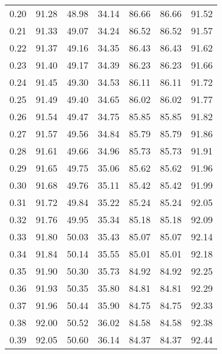 \begin{tabular}{|c|c|c|c|c|c|c|}
      0.20 &     91.28 &     48.98 &      34.14 &   86.66 &      86.66 &         91.52 \\
      0.21 &     91.33 &     49.07 &      34.24 &   86.52 &      86.52 &         91.57 \\
      0.22 &     91.37 &     49.16 &      34.35 &   86.43 &      86.43 &         91.62 \\
      0.23 &     91.40 &     49.17 &      34.39 &   86.23 &      86.23 &         91.66 \\
      0.24 &     91.45 &     49.30 &      34.53 &   86.11 &      86.11 &         91.72 \\
      0.25 &     91.49 &     49.40 &      34.65 &   86.02 &      86.02 &         91.77 \\
      0.26 &     91.54 &     49.47 &      34.75 &   85.85 &      85.85 &         91.82 \\
      0.27 &     91.57 &     49.56 &      34.84 &   85.79 &      85.79 &         91.86 \\
      0.28 &     91.61 &     49.66 &      34.96 &   85.73 &      85.73 &         91.91 \\
      0.29 &     91.65 &     49.75 &      35.06 &   85.62 &      85.62 &         91.96 \\
      0.30 &     91.68 &     49.76 &      35.11 &   85.42 &      85.42 &         91.99 \\
      0.31 &     91.72 &     49.84 &      35.22 &   85.24 &      85.24 &         92.05 \\
      0.32 &     91.76 &     49.95 &      35.34 &   85.18 &      85.18 &         92.09 \\
      0.33 &     91.80 &     50.03 &      35.43 &   85.07 &      85.07 &         92.14 \\
      0.34 &     91.84 &     50.14 &      35.55 &   85.01 &      85.01 &         92.18 \\
      0.35 &     91.90 &     50.30 &      35.73 &   84.92 &      84.92 &         92.25 \\
      0.36 &     91.93 &     50.35 &      35.80 &   84.81 &      84.81 &         92.29 \\
      0.37 &     91.96 &     50.44 &      35.90 &   84.75 &      84.75 &         92.33 \\
      0.38 &     92.00 &     50.52 &      36.02 &   84.58 &      84.58 &         92.38 \\
      0.39 &     92.05 &     50.60 &      36.14 &   84.37 &      84.37 &         92.44 \\

\end{tabular}
